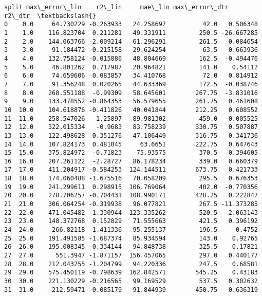 \documentclass[11pt]{article}
\makeatletter
\newcommand{\boxspacing}{\kern\kvtcb@left@rule\kern\kvtcb@boxsep}
\newcommand{\prompt}[4]{
        {\ttfamily\llap{{\color{#2}[#3]:\hspace{3pt}#4}}\vspace{-\baselineskip}}
    }
\makeatother
\begin{document}
            \begin{tcolorbox}[breakable, size=fbox, boxrule=.5pt, pad at break*=1mm, opacityfill=0]
\prompt{Out}{outcolor}{78}{\boxspacing}
\begin{Verbatim}[commandchars=\\\{\}]
   split max\_error\_lin    r2\_lin     mae\_lin max\_error\_dtr     r2\_dtr  \textbackslash{}
0    0.0     64.730229 -0.263933   24.258697          42.0   0.506348
1    1.0    116.823704  0.211281   49.331911         250.5 -26.667285
2    2.0    144.063766 -2.009214   61.296291         261.5  -0.084654
3    3.0     91.184472 -0.215158   29.624254          63.5   0.663936
4    4.0    132.758124 -0.015886   48.804669         162.5  -0.494476
5    5.0     46.801262  0.717987   20.964821         141.0    0.54112
6    6.0     74.659606  0.083857   34.410768          72.0   0.814912
7    7.0     91.356248  0.020265   44.633369         172.5  -0.038746
8    8.0    268.551188  -0.99309   58.645601        267.75  -3.831016
9    9.0    133.478552 -0.864353   56.579655        261.75   0.461608
10  10.0    104.618876 -0.411826   40.041844        212.25   0.608552
11  11.0    258.547026  -1.25897   89.981302         459.0   0.005525
12  12.0    322.015334   -0.9683   83.758239        330.75   0.507887
13  13.0    122.498628  0.351276   47.106449        316.75   0.341736
14  14.0    107.824173  0.481045     63.6651        222.75   0.647643
15  15.0    375.824972  -0.71823    75.93575         370.5   0.394605
16  16.0    207.261122  -2.28727   86.178234         339.0   0.660379
17  17.0    411.204917 -0.584253  124.144511        673.75   0.421733
18  18.0    174.060488 -1.675516   70.058209         295.5   0.676353
19  19.0    241.299611  0.298915  106.769064         402.0  -0.770356
20  20.0    278.706257 -0.704431  108.990171        428.25   0.222847
21  21.0    306.064254 -0.319938   96.077821         267.5 -11.373285
22  22.0    471.045482 -1.330944  123.335262         520.5  -2.063143
23  23.0    148.372768  0.152829   71.555663         421.5   0.396192
24  24.0     266.82118 -1.411336   95.255137         196.5     0.4752
25  25.0    191.491585 -1.687374   85.934594         143.0    0.92765
26  26.0    195.008345 -0.334144   94.848738         325.5    0.17821
27  27.0      551.3947 -1.871157  156.457065         297.0   0.440177
28  28.0    212.043255 -1.204799   94.220336         247.5    0.68581
29  29.0    575.450119 -0.798639  162.842571        545.25    0.43183
30  30.0    221.130229 -0.216565   99.169529         537.5   0.302632
31  31.0     212.59471 -0.085179   91.844939        450.75   0.636319

\end{Verbatim}
\end{tcolorbox}
\end{document}
